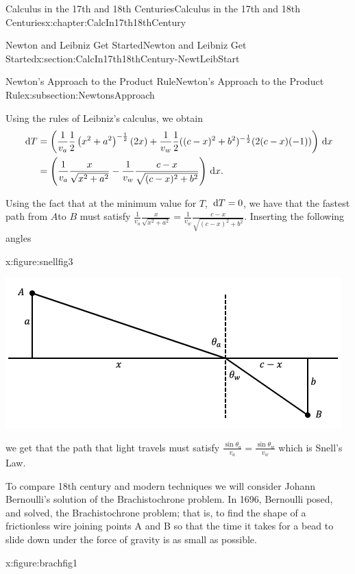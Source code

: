 \begin{chapterptx}{Calculus in the 17th and 18th Centuries}{}{Calculus in the 17th and 18th Centuries}{}{}{x:chapter:CalcIn17th18thCentury}
\begin{sectionptx}{Newton and Leibniz Get Started}{}{Newton and Leibniz Get Started}{}{}{x:section:CalcIn17th18thCentury-NewtLeibStart}
\begin{subsectionptx}{Newton's Approach to the Product Rule}{}{Newton's Approach to the Product Rule}{}{}{x:subsection:NewtonsApproach}
\begin{equation*}
			\end{equation*}
			\par
			Using the rules of Leibniz's calculus, we obtain%
			\begin{align*}
				\,{\rm d} T& = \left(\frac{1}{v_a}\frac{1}{2}\left(x^2+a^2\right)^{-\frac{1}{2}} (2x)+\frac{1}{v_w}\frac{1}{2}((c-x)^2+b^2)^{-\frac{1}{2}}(2(c-x)(-1))\right) \,{\rm d} x\\
				& =\left(\frac{1}{v_a}\frac{x}{\sqrt{x^2+a^2}}-\frac{1}{v_w}\frac{c-x}{\sqrt{(c-x)^2+b^2}}\right)\,{\rm d} x\text{.}
			\end{align*}
			\par
			Using the fact that at the minimum value for \(T\), \(\,{\rm d} T=0\), we have that the fastest path from \(A\)to \(B\) must satisfy \(\frac{1}{v_a}\frac{x}{\sqrt{x^2+a^2}}=\frac{1}{v_w}\frac{c-x}{\sqrt{(c-x)^2+b^2}}\). Inserting the following angles%
			\begin{figureptx}{}{x:figure:snellfig3}{}%
				\begin{image}{0.125}{0.75}{0.125}%
					\includegraphics[width=\linewidth]{external/images/snellfig3.png}
				\end{image}%
				\tcblower
			\end{figureptx}%
			we get that the path that light travels must satisfy \(\frac{\sin\theta_a}{v_a}=\frac{\sin\theta_w}{v_w}\) which is Snell's Law.%
			\par
			 To compare 18th century and modern techniques we will consider Johann Bernoulli's solution of the Brachistochrone problem. In 1696, Bernoulli posed, and solved, the Brachistochrone problem; that is, to find the shape of a frictionless wire joining points A and B so that the time it takes for a bead to slide down under the force of gravity is as small as possible.%
			\begin{figureptx}{}{x:figure:brachfig1}{}%
				\begin{image}{0.125}{0.75}{0.125}%

\end{image}
\end{figureptx}
\end{subsectionptx}
\end{sectionptx}
\end{chapterptx}

